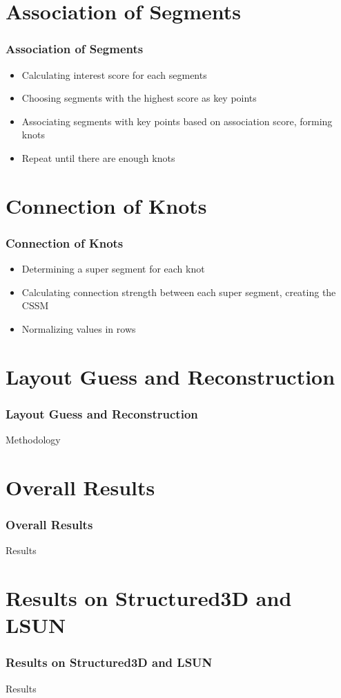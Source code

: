 \documentclass{beamer}
\begin{document}
\section{Association of Segments}
\begin{frame}
\frametitle{Association of Segments}
\begin{itemize}
    \item Calculating interest score for each segments
    \item Choosing segments with the highest score as key points
    \item Associating segments with key points based on association score, forming knots
    \item Repeat until there are enough knots
\end{itemize}
\end{frame}

\section{Connection of Knots}
\begin{frame}
\frametitle{Connection of Knots}
\begin{itemize}
    \item Determining a super segment for each knot
    \item Calculating connection strength between each super segment, creating the CSSM
    \item Normalizing values in rows
\end{itemize}
\end{frame}

\section{Layout Guess and Reconstruction}
\begin{frame}
\frametitle{Layout Guess and Reconstruction}
Methodology
\end{frame}

\section{Overall Results}
\begin{frame}
\frametitle{Overall Results}
Results
\end{frame}

\section{Results on Structured3D and LSUN}
\begin{frame}
\frametitle{Results on Structured3D and LSUN}
Results
\end{frame}
\end{document}
